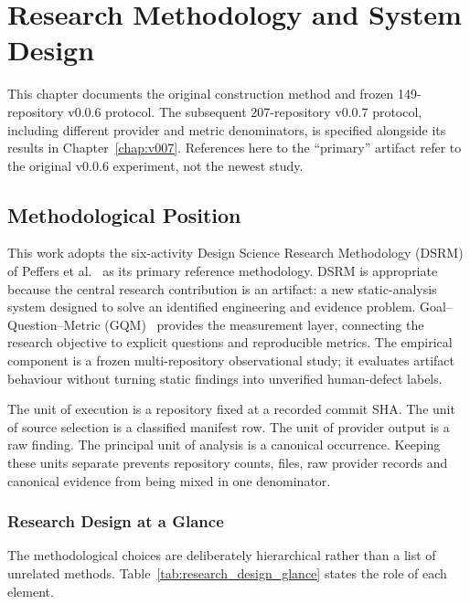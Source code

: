 \chapter{Research Methodology and System Design}
\label{chap:methodology}

This chapter documents the original construction method and frozen
149-repository v0.0.6 protocol. The subsequent 207-repository v0.0.7 protocol,
including different provider and metric denominators, is specified alongside
its results in Chapter~\ref{chap:v007}. References here to the ``primary''
artifact refer to the original v0.0.6 experiment, not the newest study.

\section{Methodological Position}
This work adopts the six-activity Design Science Research Methodology (DSRM) of
Peffers et al.~\cite{peffers2007dsrm} as its primary reference methodology.
DSRM is appropriate because the central research contribution is an artifact:
a new static-analysis system designed to solve an identified engineering and
evidence problem. Goal--Question--Metric (GQM)~\cite{basili1992gqm} provides the
measurement layer, connecting the research objective to explicit questions
and reproducible metrics. The empirical component is a frozen
multi-repository observational study; it evaluates artifact behaviour without
turning static findings into unverified human-defect labels.

The unit of execution is a repository fixed at a recorded commit SHA. The unit
of source selection is a classified manifest row. The unit of provider output
is a raw finding. The principal unit of analysis is a canonical occurrence.
Keeping these units separate prevents repository counts, files, raw provider
records and canonical evidence from being mixed in one denominator.

\subsection{Research Design at a Glance}
The methodological choices are deliberately hierarchical rather than a list of
unrelated methods. Table~\ref{tab:research_design_glance} states the role of
each element.

